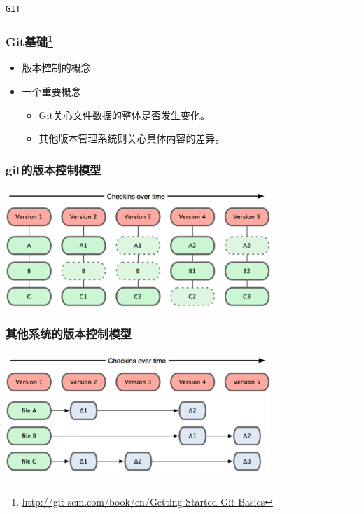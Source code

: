 
\begin{frame}
    \begin{center}
        \LARGE \tt{GIT}
    \end{center}
\end{frame}

\begin{frame}
    \frametitle{Git基础\footnote{\url{http://git-scm.com/book/en/Getting-Started-Git-Basics}}}
    \begin{itemize}    
        \item 版本控制的概念
        \item 一个重要概念
            \begin{itemize}
                \item Git关心文件数据的整体是否发生变化。
                \item 其他版本管理系统则关心具体内容的差异。
            \end{itemize}
    \end{itemize}
\end{frame}

\begin{frame}
    \frametitle{git的版本控制模型}
    \includegraphics[width=10cm,keepaspectratio]{data/GitRevisionModel.png}
\end{frame}

\begin{frame}
    \frametitle{其他系统的版本控制模型}
    \includegraphics[width=10cm,keepaspectratio]{data/OtherRevisionModel.png}
\end{frame}


